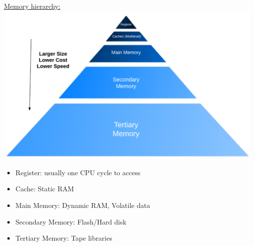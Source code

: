 \underline{Memory hierarchy:}\\
\includegraphics*[width=\columnwidth]{images/memory_hierarchy.png}
\begin{itemize}[itemsep=0pt, topsep=0pt, partopsep=0pt]
    \item Register: usually one CPU cycle to access
    \item Cache: Static RAM
    \item Main Memory: Dynamic RAM, Volatile data
    \item Secondary Memory: Flash/Hard disk
    \item Tertiary Memory: Tape libraries
\end{itemize}